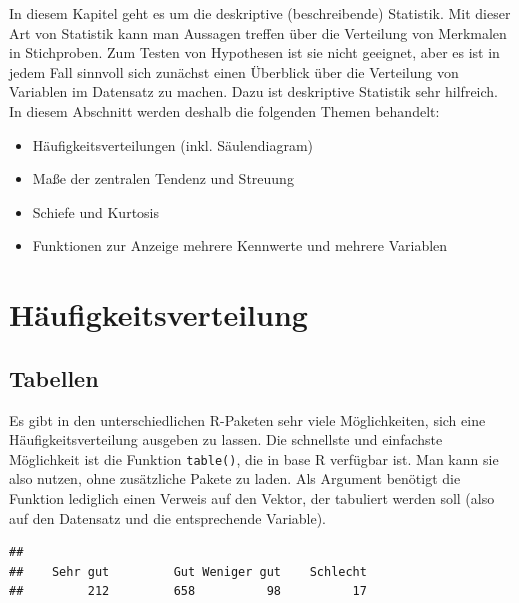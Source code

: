 \documentclass[
]{book}
\newenvironment{Shaded}{\begin{snugshade}}{\end{snugshade}}
\newcommand{\CommentTok}[1]{\textcolor[rgb]{0.56,0.35,0.01}{\textit{#1}}}
\newcommand{\FunctionTok}[1]{\textcolor[rgb]{0.00,0.00,0.00}{#1}}
\newcommand{\NormalTok}[1]{#1}
\newcommand{\SpecialCharTok}[1]{\textcolor[rgb]{0.00,0.00,0.00}{#1}}
\providecommand{\tightlist}{%
  \setlength{\itemsep}{0pt}\setlength{\parskip}{0pt}}
\begin{document}
In diesem Kapitel geht es um die deskriptive (beschreibende) Statistik. Mit dieser Art von Statistik kann man Aussagen treffen über die Verteilung von Merkmalen in Stichproben. Zum Testen von Hypothesen ist sie nicht geeignet, aber es ist in jedem Fall sinnvoll sich zunächst einen Überblick über die Verteilung von Variablen im Datensatz zu machen. Dazu ist deskriptive Statistik sehr hilfreich. In diesem Abschnitt werden deshalb die folgenden Themen behandelt:

\begin{itemize}
\tightlist
\item
  Häufigkeitsverteilungen (inkl. Säulendiagram)
\item
  Maße der zentralen Tendenz und Streuung
\item
  Schiefe und Kurtosis
\item
  Funktionen zur Anzeige mehrere Kennwerte und mehrere Variablen
\end{itemize}

\hypertarget{huxe4ufigkeitsverteilung}{%
\section{Häufigkeitsverteilung}\label{huxe4ufigkeitsverteilung}}

\hypertarget{tabellen}{%
\subsection{Tabellen}\label{tabellen}}

Es gibt in den unterschiedlichen R-Paketen sehr viele Möglichkeiten, sich eine Häufigkeitsverteilung ausgeben zu lassen. Die schnellste und einfachste Möglichkeit ist die Funktion \texttt{table()}, die in base R verfügbar ist. Man kann sie also nutzen, ohne zusätzliche Pakete zu laden. Als Argument benötigt die Funktion lediglich einen Verweis auf den Vektor, der tabuliert werden soll (also auf den Datensatz und die entsprechende Variable).

\begin{Shaded}
\end{Shaded}

\begin{verbatim}
## 
##    Sehr gut         Gut Weniger gut    Schlecht 
##         212         658          98          17
\end{verbatim}
\end{document}
